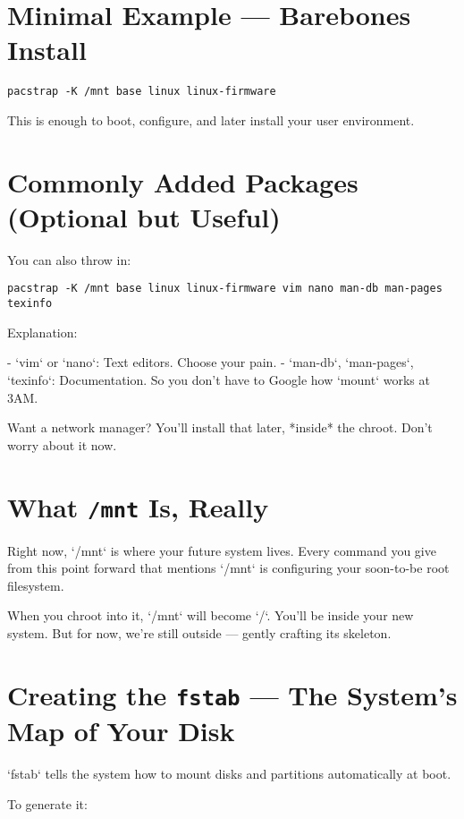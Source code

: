 \documentclass[12pt]{book}
\begin{document}
\section{Minimal Example — Barebones Install}

\begin{lstlisting}
pacstrap -K /mnt base linux linux-firmware
\end{lstlisting}

This is enough to boot, configure, and later install your user environment.

\section{Commonly Added Packages (Optional but Useful)}

You can also throw in:

\begin{lstlisting}
pacstrap -K /mnt base linux linux-firmware vim nano man-db man-pages texinfo
\end{lstlisting}

Explanation:

- `vim` or `nano`: Text editors. Choose your pain.
- `man-db`, `man-pages`, `texinfo`: Documentation. So you don’t have to Google how `mount` works at 3AM.

Want a network manager? You’ll install that later, *inside* the chroot. Don’t worry about it now.

\section{What \texttt{/mnt} Is, Really}

Right now, `/mnt` is where your future system lives. Every command you give from this point forward that mentions `/mnt` is configuring your soon-to-be root filesystem.

When you chroot into it, `/mnt` will become `/`. You’ll be inside your new system. But for now, we’re still outside — gently crafting its skeleton.

\section{Creating the \texttt{fstab} — The System's Map of Your Disk}

`fstab` tells the system how to mount disks and partitions automatically at boot.

To generate it:
\end{document}
